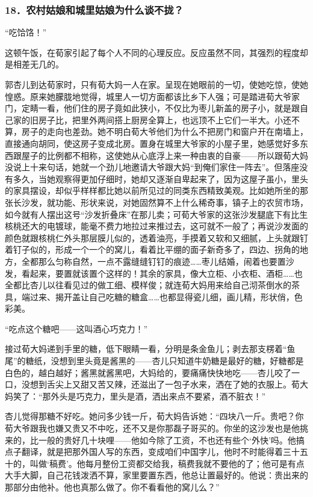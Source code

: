 \subsubsection*{18．农村姑娘和城里姑娘为什么谈不拢？}
\par “吃饸饹！”
\par 这顿午饭，在荀家引起了每个人不同的心理反应。反应虽然不同，其强烈的程度却是相差无几的。
\par 郭杏儿到达荀家时，只有荀大妈一人在家。呈现在她眼前的一切，使她吃惊，使她惶惑。原来她朦胧地觉得，城里人一切方面都该比乡下人强；可是踏进荀大爷家门，定睛一看，他们住的房子竟如此狭小，不仅比为枣儿新盖的房子小，就是跟自己家的旧房子比，把里外两间搭上厨房全算上，也远顶不上它们一半大。小还不算，房子的走向也差劲。她不明白荀大爷他们为什么不把房门和窗户开在南墙上，直接通向胡同，使这房子变成北房。置身在城里大爷家的小屋子里，她感觉好多东西跟屋子的比例都不相称，这使她从心底浮上来一种由衷的自豪——所以跟荀大妈没说上十来句话，她就一个劲儿地邀请大爷跟大妈“到俺们家住一阵去”。但落座没有多久，当她观察得更加仔细时，她却又逐渐自卑起来了，因为这屋子虽小，里头的家具摆设，却似乎样样都比她以前所见过的同类东西精致美观。比如她所坐的那张长沙发，就功能、形状来说，对她固然算不上什么稀奇事，镇子上的农贸市场，如今就有人摆出这号“沙发折叠床”在那儿卖；可荀大爷家的这张沙发腿底下有比生核桃还大的电镀球，能毫不费力地拉过来推过去，这可就不一般了；再说沙发面的颜色就跟核桃仁外头那层膜儿似的，透着油亮，手摸着又软和又细腻，上头就跟钉着钉子似的，形成一个一个的窝儿，看着比平绷的面子新奇多了，四边、拐角的地方，全都那么匀称自然，一点不露缝缝钉钉的痕迹……枣儿结婚，闹着也要置沙发，看起来，要置就该置个这样的！其余的家具，像大立柜、小衣柜、酒柜……也全都比杏儿以往看见过的做工细、模样俊；就连荀大妈用来给自己沏茶倒水的茶具，端过来、揭开盖让自己吃糖的糖盒……也都显得瓷儿细，画儿精，形状俏，色彩美。
\par “吃点这个糖吧——这叫酒心巧克力！”
\par 接过荀大妈递到手里的糖，低下眼睛一看，分明是条金鱼儿；剥去那支楞着“鱼尾”的糖纸，没想到里头竟是酱黑的——杏儿只知道牛奶糖是最好的糖，好糖都是白色的，越白越好；酱黑就酱黑吧，大妈给的，要痛痛快快地吃——杏儿咬了一口，没想到舌尖上又甜又苦又辣，还滋出了一包子水来，洒在了她的衣服上。荀大妈笑了：“那外头是巧克力，里头是酒，洒出来点不要紧，酒不脏衣！”
\par 杏儿觉得那糖不好吃。她问多少钱一斤，荀大妈告诉她：“四块八一斤。贵吧？你荀大爷跟我也嫌又贵又不中吃，还不又是你那磊子哥买的。你坐的这沙发也是他挑来的，比一般的贵好几十块哩——他如今除了工资，不也还有些个‘外快’吗。他搞点子翻译，就是把那外国人写的东西，变成咱们中国字儿，他时不时能得着三十五十的，叫做‘稿费’。他每月整份工资都交给我，稿费我就不要他的了；他可是有点大手大脚，自己花钱泼洒不算，家里要置东西，他总让置最好的。他说：贵出来的那部分由他补。他也真那么做了。你不看看他的窝儿么？”
